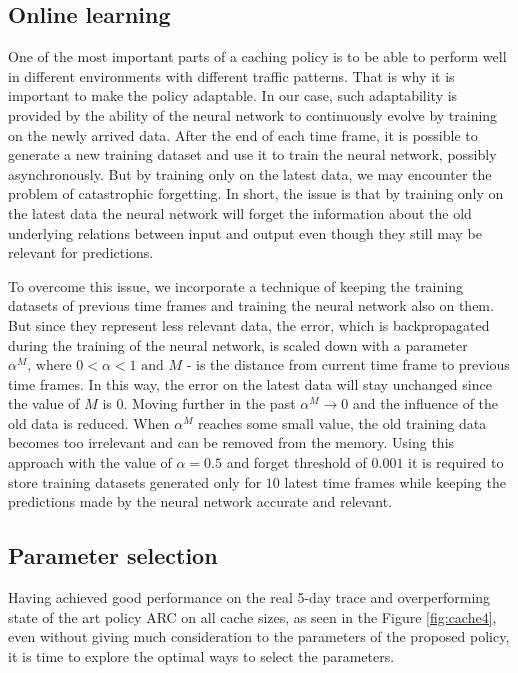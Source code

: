 \subsection{Online learning} \label{online_learning}

One of the most important parts of a caching policy is to be able to perform well in different environments with different traffic patterns. That is why it is important to make the policy adaptable. In our case, such adaptability is provided by the ability of the neural network to continuously evolve by training on the newly arrived data. After the end of each time frame, it is possible to generate a new training dataset and use it to train the neural network, possibly asynchronously. But by training only on the latest data, we may encounter the problem of catastrophic forgetting\cite{16, 17}. In short, the issue is that by training only on the latest data the neural network will forget the information about the old underlying relations between input and output even though they still may be relevant for predictions. 

To overcome this issue, we incorporate a technique of keeping the training datasets of previous time frames and training the neural network also on them. But since they represent less relevant data, the error, which is backpropagated during the training of the neural network, is scaled down with a parameter $\alpha^M \text{, where } 0 < \alpha < 1 \text{ and } M$ - is the distance from current time frame to previous time frames. In this way, the error on the latest data will stay unchanged since the value of $M$ is $0$. Moving further in the past $\alpha^M \rightarrow 0$ and the influence of the old data is reduced. When $\alpha^M$ reaches some small value, the old training data becomes too irrelevant and can be removed from the memory. Using this approach with the value of $\alpha = 0.5$ and forget threshold of $0.001$ it is required to store training datasets generated only for $10$ latest time frames while keeping the predictions made by the neural network accurate and relevant.

\subsection{Parameter selection} \label{parameter_selection}

Having achieved good performance on the real 5-day trace and overperforming state of the art policy ARC on all cache sizes, as seen in the Figure \ref{fig:cache4}, even without giving much consideration to the parameters of the proposed policy, it is time to explore the optimal ways to select the parameters.


